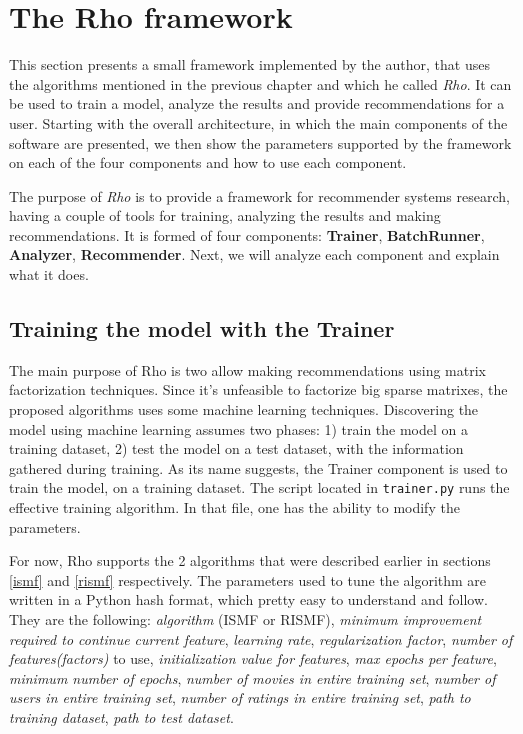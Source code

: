 \documentclass[11pt]{amsart}
\begin{document}
\section{The Rho framework}
\label{sec:rho}

This section presents a small framework implemented by the author, that uses the algorithms mentioned in the previous chapter and which he called \emph{Rho}. It can be used to train a model, analyze the results and provide recommendations for a user. Starting with the overall architecture, in which the main components of the software are presented, we then show the parameters supported by the framework on each of the four components and how to use each component.

The purpose of \emph{Rho} is to provide a framework for recommender systems research, having a couple of tools for training, analyzing the results and making recommendations. It is formed of four components: \textbf{Trainer}, \textbf{BatchRunner}, \textbf{Analyzer}, \textbf{Recommender}. Next, we will analyze each component and explain what it does. 

\subsection{Training the model with the \textbf{Trainer}}
\label{trainer}

The main purpose of Rho is two allow making recommendations using matrix factorization techniques. Since it's unfeasible to factorize big sparse matrixes, the proposed algorithms uses some machine learning techniques. Discovering the model using machine learning assumes two phases: 1) train the model on a training dataset, 2) test the model on a test dataset, with the information gathered during training. As its name suggests, the Trainer component is used to train the model, on a training dataset. The script located in \texttt{trainer.py} runs the effective training algorithm. In that file, one has the ability to modify the parameters.

For now, Rho supports the 2 algorithms that were described earlier in sections \ref{ismf} and \ref{rismf} respectively. The parameters used to tune the algorithm are written in a Python hash format, which pretty easy to understand and follow. They are the following:
\emph{algorithm} (ISMF or RISMF), \emph{minimum improvement required to continue current feature}, \emph{learning rate}, \emph{regularization factor}, \emph{number of features(factors)} to use, \emph{initialization value for features}, \emph{max epochs per feature}, \emph{minimum number of epochs}, \emph{number of movies in entire training set}, \emph{number of users in entire training set}, \emph{number of ratings in entire training set}, \emph{path to training dataset}, \emph{path to test dataset}.
\end{document}
